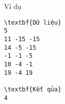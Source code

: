 Ví dụ
\begin{verbatim}
\textbf{Dữ liệu} 
5
11 -15 -15
14 -5 -15
-1 -1 -5
10 -4 -1
19 -4 19

\textbf{Kết qủa} 
4 
\end{verbatim}